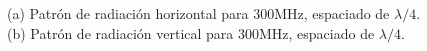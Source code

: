 \documentclass[11pt]{book}
\begin{document}
\begin{figure}[h]
	\centering
	\caption{(a) Patrón de radiación horizontal para 300MHz, espaciado de $\lambda / 4$. (b) Patrón de radiación vertical  para 300MHz, espaciado de $\lambda / 4$.  }
\end{figure}
\end{document}
